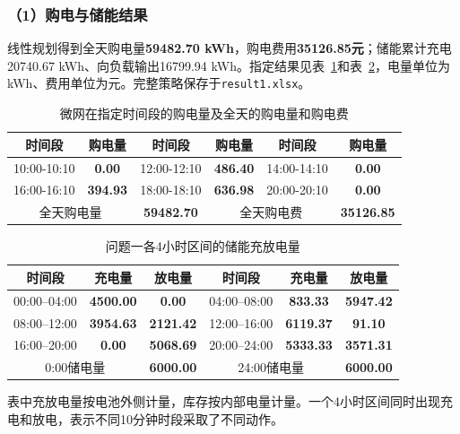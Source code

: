 \subsubsection*{（1）购电与储能结果}
线性规划得到全天购电量\textbf{59482.70 kWh}，购电费用\textbf{35126.85元}；储能累计充电20740.67 kWh、向负载输出16799.94 kWh。指定结果见表~\ref{tab:q1_purchase_result}和表~\ref{tab:q1_storage_result}，电量单位为kWh、费用单位为元。完整策略保存于\texttt{result1.xlsx}。
\begin{table}[H]
    \centering
    \caption{微网在指定时间段的购电量及全天的购电量和购电费 }
    \label{tab:q1_purchase_result}
    \begin{tabular}{|c|c|c|c|c|c|}
        \hline
        时间段 & 购电量 & 时间段 & 购电量 & 时间段 & 购电量 \\
        \hline
        10:00-10:10 & \textbf{0.00} & 12:00-12:10 & \textbf{486.40} & 14:00-14:10 & \textbf{0.00} \\
        \hline
        16:00-16:10 & \textbf{394.93} & 18:00-18:10 & \textbf{636.98} & 20:00-20:10 & \textbf{0.00} \\
        \hline
        \multicolumn{2}{|c|}{全天购电量} & \multicolumn{1}{c|}{\textbf{59482.70}} & \multicolumn{2}{c|}{全天购电费} & \multicolumn{1}{c|}{\textbf{35126.85}}\\
        \hline
    \end{tabular}
\end{table}
\begin{table}[H]
    \centering
    \caption{问题一各4小时区间的储能充放电量}
    \label{tab:q1_storage_result}
    \begin{tabular}{|c|c|c|c|c|c|}
        \hline
        时间段 & 充电量 & 放电量 & 时间段 & 充电量 & 放电量 \\
        \hline
        00:00--04:00 & \textbf{4500.00} & \textbf{0.00} & 04:00--08:00 & \textbf{833.33} & \textbf{5947.42} \\
        \hline
        08:00--12:00 & \textbf{3954.63} & \textbf{2121.42} & 12:00--16:00 & \textbf{6119.37} & \textbf{91.10} \\
        \hline
        16:00--20:00 & \textbf{0.00} & \textbf{5068.69} & 20:00--24:00 & \textbf{5333.33} & \textbf{3571.31} \\
        \hline
        \multicolumn{2}{|c|}{0:00储电量} & \multicolumn{1}{|c|}{\textbf{6000.00}} & \multicolumn{2}{c|}{24:00储电量} & \multicolumn{1}{c|}{\textbf{6000.00}}\\
        \hline
    \end{tabular}
\end{table}
表中充放电量按电池外侧计量，库存按内部电量计量。一个4小时区间同时出现充电和放电，表示不同10分钟时段采取了不同动作。

